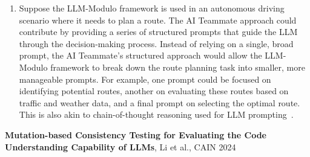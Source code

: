 \documentclass[11pt]{article}
\begin{document}
\begin{enumerate}[label=(\alph*),leftmargin=*]
    \item Suppose the LLM-Modulo framework is used in an autonomous driving scenario where it needs to plan a route. The AI Teammate approach could contribute by providing a series of structured prompts that guide the LLM through the decision-making process. Instead of relying on a single, broad prompt, the AI Teammate’s structured approach would allow the LLM-Modulo framework to break down the route planning task into smaller, more manageable prompts. For example, one prompt could be focused on identifying potential routes, another on evaluating these routes based on traffic and weather data, and a final prompt on selecting the optimal route. This is also akin to chain-of-thought reasoning used for LLM prompting~\cite{chain_of_thought}.

\end{enumerate}

\hspace{-6mm}\textbf{Mutation-based Consistency Testing for Evaluating the Code Understanding Capability of LLMs}, Li et al., CAIN 2024~\cite{10.1145/3644815.3644946}
\end{document}
